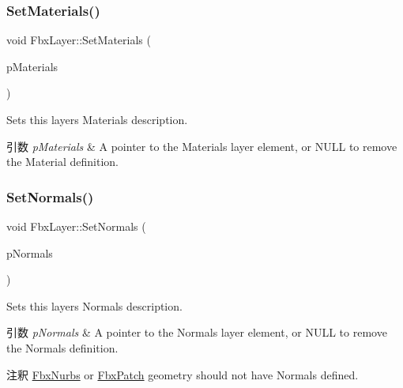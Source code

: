 \mbox{\label{class_fbx_layer_a7fbdddfcc81d225fa2e5abff9fae39a6}} 
\subsubsection{\texorpdfstring{Set\+Materials()}{SetMaterials()}}
{\footnotesize\ttfamily void Fbx\+Layer\+::\+Set\+Materials (\begin{DoxyParamCaption}\item[{\hyperlink{class_fbx_layer_element_material}{Fbx\+Layer\+Element\+Material} $\ast$}]{p\+Materials }\end{DoxyParamCaption})}

Sets this layer\textquotesingle{}s Materials description. 
\begin{DoxyParams}{引数}
{\em p\+Materials} & A pointer to the Materials layer element, or {\ttfamily N\+U\+LL} to remove the Material definition. \\
\hline
\end{DoxyParams}
\mbox{\label{class_fbx_layer_a1201a72e048e3da61fc8226872e70f01}} 
\subsubsection{\texorpdfstring{Set\+Normals()}{SetNormals()}}
{\footnotesize\ttfamily void Fbx\+Layer\+::\+Set\+Normals (\begin{DoxyParamCaption}\item[{\hyperlink{class_fbx_layer_element_normal}{Fbx\+Layer\+Element\+Normal} $\ast$}]{p\+Normals }\end{DoxyParamCaption})}

Sets this layer\textquotesingle{}s Normals description. 
\begin{DoxyParams}{引数}
{\em p\+Normals} & A pointer to the Normals layer element, or {\ttfamily N\+U\+LL} to remove the Normals definition. \\
\hline
\end{DoxyParams}
\begin{DoxyRemark}{注釈}
\hyperlink{class_fbx_nurbs}{Fbx\+Nurbs} or \hyperlink{class_fbx_patch}{Fbx\+Patch} geometry should not have Normals defined. 
\end{DoxyRemark}
\mbox{\label{class_fbx_layer_a6711d6e68215f1385a328df93188aaea}} 
